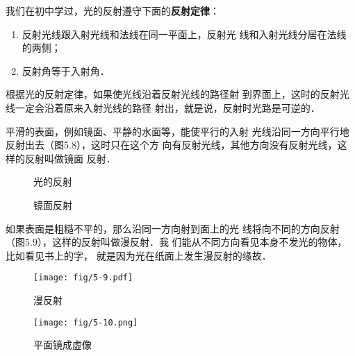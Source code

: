 我们在初中学过，光的反射遵守下面的\textbf{反射定律}：

\begin{enumerate}
    \item 反射光线跟入射光线和法线在同一平面上，反射光
线和入射光线分居在法线的两侧；
\item 反射角等于入射角．
\end{enumerate}

根据光的反射定律，如果使光线沿着反射光线的路径射
到界面上，这时的反射光线一定会沿着原来入射光线的路径
射出，就是说，反射时光路是可逆的．

平滑的表面，例如镜面、平静的水面等，能使平行的入射
光线沿同一方向平行地反射出去（图5.8），这时只在这个方
向有反射光线，其他方向没有反射光线，这样的反射叫做镜面
反射．
\begin{figure}[htp]
    \centering
    \begin{minipage}[t]{0.48\textwidth}
    \centering
    \caption{光的反射}
    \end{minipage}
    \begin{minipage}[t]{0.48\textwidth}
    \centering
    \caption{镜面反射}
    \end{minipage}
    \end{figure}

如果表面是粗糙不平的，那么沿同一方向射到面上的光
线将向不同的方向反射（图5.9），这样的反射叫做漫反射．我
们能从不同方向看见本身不发光的物体，比如看见书上的字，
就是因为光在纸面上发生漫反射的缘故．
\begin{figure}[htp]
    \centering
    \begin{minipage}[t]{0.48\textwidth}
    \centering
    \texttt{[image: fig/5-9.pdf]}
    \caption{漫反射}
    \end{minipage}
    \begin{minipage}[t]{0.48\textwidth}
    \centering
    \texttt{[image: fig/5-10.png]}
    \caption{平面镜成虚像}
    \end{minipage}
    \end{figure}

